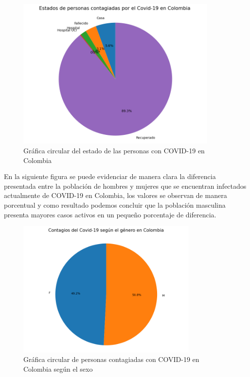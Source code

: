 \documentclass[conference,compsoc,onecolumn]{IEEEtran}
\begin{document}
\begin{figure}[H]
\centering
\includegraphics[width=10cm]{./images/GraficaCircular_Estados.png}
\caption{Gráfica circular del estado de las personas con COVID-19 en Colombia}
\label{fig:mesh1}
\end{figure}
En la siguiente figura se puede evidenciar de manera clara la diferencia presentada entre la población de hombres y mujeres que se encuentran infectados actualmente de COVID-19 en Colombia, los valores se observan de manera porcentual y como resultado podemos concluir que la población masculina presenta mayores casos activos en un pequeño porcentaje de diferencia.\\
\begin{figure}[H]
\centering
\includegraphics[width=9cm]{./images/GraficaCircular_Genero.png}
\caption{Gráfica circular de personas contagiadas con COVID-19 en Colombia según el sexo}
\label{fig:mesh1}
\end{figure}
\end{document}
